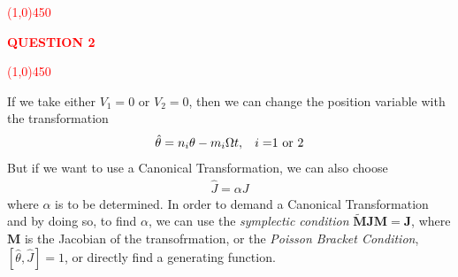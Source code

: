 %
%
%
\textcolor{red}{
\line(1,0){450}\\
\begin{center}
	\textbf{QUESTION 2}
\end{center}
\line(1,0){450}\\
}
%
%
%
%
%
If we take either $V_1=0$ or $V_2=0$, then we can change the position variable with the transformation 
	\begin{align}\label{eq2.9}
		\hat{\theta} = n_i\theta-m_i\Omega t, \text{\hspace{.3cm}$i=$1 or 2}
	\end{align}
But if we want to use a Canonical Transformation, we can also choose 
	\begin{align}\label{eq2.10}
		\hat{J} = \alpha J 
	\end{align}
where $\alpha$ is to be determined. In order to demand a Canonical Transformation and by doing so, to find $\alpha$, we can use the \textit{symplectic condition} $\tilde{\bm{M}}\bm{J}\bm{M} = \bm{J}$, where $\bm{M}$ is the Jacobian of the transofrmation, or the \textit{Poisson Bracket Condition}, $[\hat{\theta},\hat{J}]=1$, or directly find a generating function. 

